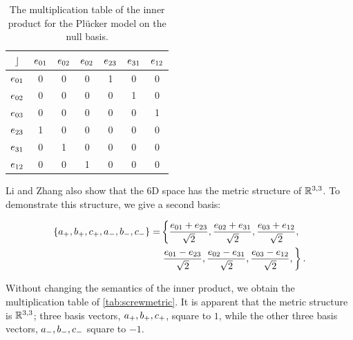 \begin{table}
  \caption{The multiplication table of the inner product for the Pl\"ucker model on the null basis.}
  \label{tab:nullmetric}
  \begin{center}
    \begin{tabular}{|c||c|c|c|c|c|c|}
      \hline
      $\mathbin{\rfloor}$ & $e_{01}$ & $e_{02}$ & $e_{02}$ & $e_{23}$ & $e_{31}$ & $e_{12}$ \\
      \hline \hline
      $e_{01}$ & 0 & 0 & 0 & 1 & 0 & 0 \\
      \hline
      $e_{02}$ & 0 & 0 & 0 & 0 & 1 & 0 \\
      \hline
      $e_{03}$ & 0 & 0 & 0 & 0 & 0 & 1 \\
      \hline
      $e_{23}$ & 1 & 0 & 0 & 0 & 0 & 0 \\
      \hline
      $e_{31}$ & 0 & 1 & 0 & 0 & 0 & 0 \\
      \hline
      $e_{12}$ & 0 & 0 & 1 & 0 & 0 & 0 \\
      \hline
    \end{tabular}
  \end{center}
\end{table}

Li and Zhang also show that the 6D space has the metric structure of $\mathbb{R}^{3,3}$.  To demonstrate this structure, we give a second basis:

\begin{equation*}
  \begin{split}
  \left\{a_{+}, b_{+}, c_{+}, a_{-}, b_{-}, c_{-}\right\} =
    & \left\{ \frac{e_{01} + e_{23}}{\sqrt{2}}, \frac{e_{02} + e_{31}}{\sqrt{2}}, \frac{e_{03} + e_{12}}{\sqrt{2}}, \right.\\
    & \left.  \frac{e_{01} - e_{23}}{\sqrt{2}}, \frac{e_{02} - e_{31}}{\sqrt{2}}, \frac{e_{03} - e_{12}}{\sqrt{2}}, \right\}
.
\end{split}
\end{equation*}

Without changing the semantics of the inner product, we obtain the multiplication table of \autoref{tab:screwmetric}.  It is apparent that the metric structure is $\mathbb{R}^{3,3}$; three basis vectors, $a_{+}, b_{+}, c_{+}$, square to $1$, while the other three basis vectors, $a_{-}, b_{-}, c_{-}$ square to $-1$.  

